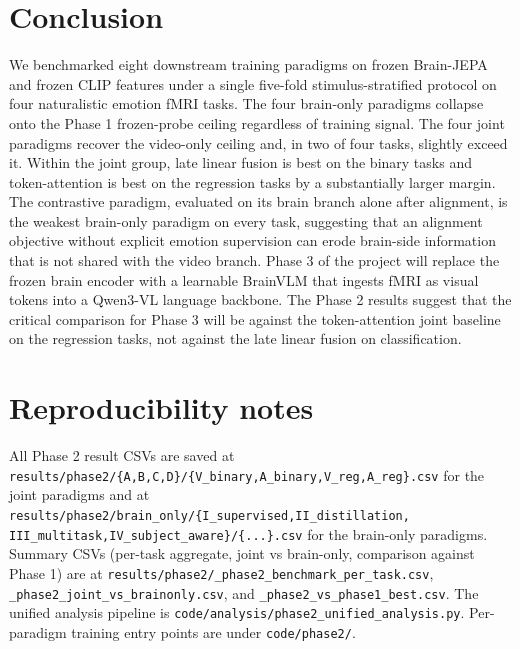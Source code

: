 \documentclass[11pt, a4paper]{article}
\newcommand{\fefn}[1]{\texttt{\small #1}}
\begin{document}
\section{Conclusion}

We benchmarked eight downstream training paradigms on frozen Brain-JEPA and frozen CLIP
features under a single five-fold stimulus-stratified protocol on four naturalistic
emotion fMRI tasks. The four brain-only paradigms collapse onto the Phase 1 frozen-probe
ceiling regardless of training signal. The four joint paradigms recover the video-only
ceiling and, in two of four tasks, slightly exceed it. Within the joint group, late
linear fusion is best on the binary tasks and token-attention is best on the regression
tasks by a substantially larger margin. The contrastive paradigm, evaluated on its brain
branch alone after alignment, is the weakest brain-only paradigm on every task,
suggesting that an alignment objective without explicit emotion supervision can erode
brain-side information that is not shared with the video branch. Phase 3 of the project
will replace the frozen brain encoder with a learnable BrainVLM that ingests fMRI as
visual tokens into a Qwen3-VL language backbone. The Phase 2 results suggest that the
critical comparison for Phase 3 will be against the token-attention joint baseline on the
regression tasks, not against the late linear fusion on classification.

\appendix
\section{Reproducibility notes}
All Phase 2 result CSVs are saved at
\fefn{results/phase2/\{A,B,C,D\}/\{V\_binary,A\_binary,V\_reg,A\_reg\}.csv} for the joint
paradigms and at \fefn{results/phase2/brain\_only/\{I\_supervised,II\_distillation,
III\_multitask,IV\_subject\_aware\}/\{...\}.csv} for the brain-only paradigms.
Summary CSVs (per-task aggregate, joint vs brain-only, comparison against Phase 1) are at
\fefn{results/phase2/\_phase2\_benchmark\_per\_task.csv},
\fefn{\_phase2\_joint\_vs\_brainonly.csv}, and
\fefn{\_phase2\_vs\_phase1\_best.csv}. The unified analysis pipeline is
\fefn{code/analysis/phase2\_unified\_analysis.py}. Per-paradigm training entry points are
under \fefn{code/phase2/}.
\end{document}
